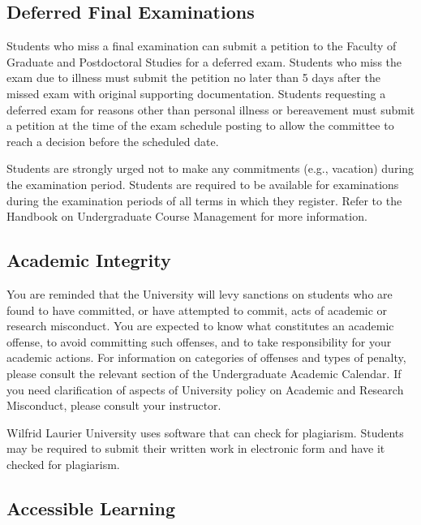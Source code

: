 \documentclass[
  letterpaper,
  DIV=11,
  numbers=noendperiod]{scrartcl}
\begin{document}
\hypertarget{deferred-final-examinations}{%
\subsection{Deferred Final
Examinations}\label{deferred-final-examinations}}

Students who miss a final examination can submit a petition to the
Faculty of Graduate and Postdoctoral Studies for a deferred exam.
Students who miss the exam due to illness must submit the petition no
later than 5 days after the missed exam with original supporting
documentation. Students requesting a deferred exam for reasons other
than personal illness or bereavement must submit a petition at the time
of the exam schedule posting to allow the committee to reach a decision
before the scheduled date.

Students are strongly urged not to make any commitments (e.g., vacation)
during the examination period. Students are required to be available for
examinations during the examination periods of all terms in which they
register. Refer to the Handbook on Undergraduate Course Management for
more information.

\hypertarget{academic-integrity}{%
\subsection{Academic Integrity}\label{academic-integrity}}

You are reminded that the University will levy sanctions on students who
are found to have committed, or have attempted to commit, acts of
academic or research misconduct. You are expected to know what
constitutes an academic offense, to avoid committing such offenses, and
to take responsibility for your academic actions. For information on
categories of offenses and types of penalty, please consult the relevant
section of the Undergraduate Academic Calendar. If you need
clarification of aspects of University policy on Academic and Research
Misconduct, please consult your instructor.

Wilfrid Laurier University uses software that can check for plagiarism.
Students may be required to submit their written work in electronic form
and have it checked for plagiarism.

\hypertarget{accessible-learning}{%
\subsection{Accessible Learning}\label{accessible-learning}}
\end{document}
